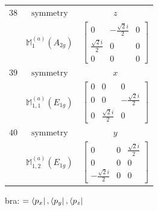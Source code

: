 \documentclass[fleqn,8pt,landscape]{jsarticle}
\begin{document}
\begin{longtable}{ccc}
$ 38 $ & $ \text{symmetry} $ & $ z $ \\
$  $ & $ \mathbb{M}_{1}^{(a)}(A_{2g}) $ & $ \begin{bmatrix} 0 & - \frac{\sqrt{2} i}{2} & 0 \\ \frac{\sqrt{2} i}{2} & 0 & 0 \\ 0 & 0 & 0 \end{bmatrix} $ \\ \hline
$ 39 $ & $ \text{symmetry} $ & $ x $ \\
$  $ & $ \mathbb{M}_{1,1}^{(a)}(E_{1g}) $ & $ \begin{bmatrix} 0 & 0 & 0 \\ 0 & 0 & - \frac{\sqrt{2} i}{2} \\ 0 & \frac{\sqrt{2} i}{2} & 0 \end{bmatrix} $ \\ \hline
$ 40 $ & $ \text{symmetry} $ & $ y $ \\
$  $ & $ \mathbb{M}_{1,2}^{(a)}(E_{1g}) $ & $ \begin{bmatrix} 0 & 0 & \frac{\sqrt{2} i}{2} \\ 0 & 0 & 0 \\ - \frac{\sqrt{2} i}{2} & 0 & 0 \end{bmatrix} $ \\ \hline
\end{longtable}
bra: $=\bra{p_{x}}, \bra{p_{y}}, \bra{p_{z}}$
\end{document}
